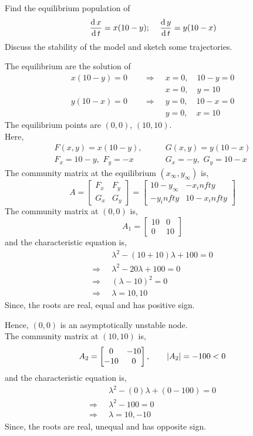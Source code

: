 \documentclass[../main-sheet.tex]{subfiles}
\begin{document}
\begin{prob}
    Find the equilibrium population of
    \[
        \,\frac{\mathrm{d}\,x}{\mathrm{d}\,t}=x(10-y);\quad \,\frac{\mathrm{d}\,y}{\mathrm{d}\,t}=y(10-x)
    \]
    Discuss the stability of the model and sketch some trajectories.
\end{prob}
\begin{soln}
    The equilibrium are the solution of
    \begin{align*}
        x(10-y)=0\qquad\Rightarrow\;&x=0,\quad 10-y=0\\
        &x=0,\quad y=10\\
        y(10-x)=0\qquad\Rightarrow\;&y=0,\quad 10-x=0\\
        &y=0,\quad x=10
    \end{align*}
    The equilibrium points are \((0,0)\), \((10,10)\).\\
    Here,
    \begin{align*}
        F(x,y)=x(10-y),\qquad &G(x,y)=y(10-x)\\
        F_x=10-y,\,\,F_y=-x\qquad &G_x=-y,\,\,G_y=10-x
    \end{align*}
    The community matrix at the equilibrium \((x_\infty,y_\infty)\) is,
    \[
        A=\begin{bmatrix}
        F_x & F_y\\
        G_x & G_y
    \end{bmatrix}=\begin{bmatrix}
        10-y_\infty & -x_infty\\
        -y_infty & 10-x_infty
    \end{bmatrix}
    \]
    The community matrix at \((0,0)\) is,
    \[A_1=\begin{bmatrix}
        10 & 0\\
        0 & 10
    \end{bmatrix}\]
    and the characteristic equation is,
    \begin{align*}
        &\lambda^2-(10+10)\lambda+100=0\\
        \Rightarrow\;\;&\lambda^2-20\lambda+100=0\\
        \Rightarrow\;\;&(\lambda-10)^2=0\\
        \Rightarrow\;\;&\lambda=10,10
    \end{align*}
    Since, the roots are real, equal and has positive sign.

    Hence, \((0,0)\) is an asymptotically unstable node.\\


    The community matrix at \((10,10)\) is,
    \[A_2=\begin{bmatrix}
        0 & -10\\
        -10 & 0
    \end{bmatrix},\qquad \left\vert A_2\right\vert=-100<0\]
    and the characteristic equation is,
    \begin{align*}
        &\lambda^2-(0)\lambda+(0-100)=0\\
        \Rightarrow\;\;&\lambda^2-100=0\\
        \Rightarrow\;\;&\lambda=10,-10
    \end{align*}
    Since, the roots are real, unequal and has opposite sign.


\end{soln}
\end{document}
